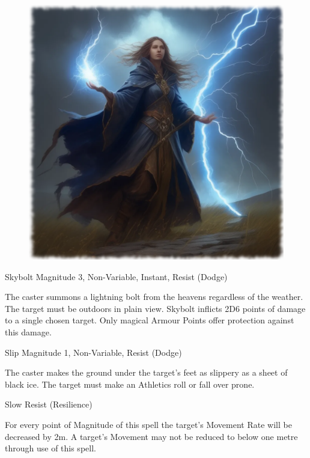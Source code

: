 \begin{figure}[h]
\begin{center}
\includegraphics[scale=0.24]{img/ai-images/wizard-skybolt.png}
\end{center}
\end{figure}

\begin{rpg-spell}
{Skybolt}
{Magnitude 3, Non-Variable, Instant, Resist (Dodge)}

The caster summons a lightning bolt from the heavens regardless of the weather. The target must be outdoors in plain view. Skybolt inflicts 2D6 points of damage to a single chosen target. Only magical Armour Points offer protection against this damage.
\end{rpg-spell}


\begin{rpg-spell}
{Slip}
{Magnitude 1, Non-Variable, Resist (Dodge)}

The caster makes the ground under the target’s feet as slippery as a sheet of black ice. The target must make an Athletics roll or fall over prone.
\end{rpg-spell}


\begin{rpg-spell}
{Slow}
{Resist (Resilience)}

For every point of Magnitude of this spell the target’s Movement Rate will be decreased by 2m. A target’s Movement may not be reduced to below one metre through use of this spell. 
\end{rpg-spell}


